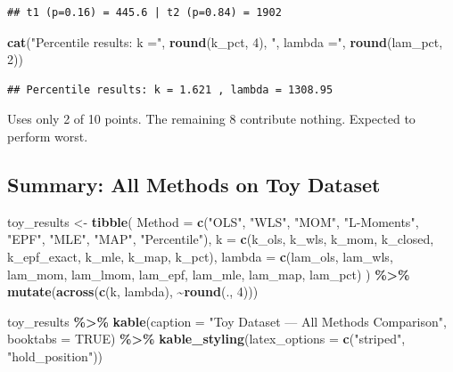 \documentclass[
]{article}
\newenvironment{Shaded}{\begin{snugshade}}{\end{snugshade}}
\newcommand{\AttributeTok}[1]{\textcolor[rgb]{0.13,0.29,0.53}{#1}}
\newcommand{\ConstantTok}[1]{\textcolor[rgb]{0.56,0.35,0.01}{#1}}
\newcommand{\DecValTok}[1]{\textcolor[rgb]{0.00,0.00,0.81}{#1}}
\newcommand{\FunctionTok}[1]{\textcolor[rgb]{0.13,0.29,0.53}{\textbf{#1}}}
\newcommand{\NormalTok}[1]{#1}
\newcommand{\OtherTok}[1]{\textcolor[rgb]{0.56,0.35,0.01}{#1}}
\newcommand{\SpecialCharTok}[1]{\textcolor[rgb]{0.81,0.36,0.00}{\textbf{#1}}}
\newcommand{\StringTok}[1]{\textcolor[rgb]{0.31,0.60,0.02}{#1}}
\begin{document}
\begin{verbatim}
## t1 (p=0.16) = 445.6 | t2 (p=0.84) = 1902
\end{verbatim}

\begin{Shaded}
\begin{Highlighting}[]
\FunctionTok{cat}\NormalTok{(}\StringTok{"Percentile results: k ="}\NormalTok{, }\FunctionTok{round}\NormalTok{(k\_pct, }\DecValTok{4}\NormalTok{), }\StringTok{", lambda ="}\NormalTok{, }\FunctionTok{round}\NormalTok{(lam\_pct, }\DecValTok{2}\NormalTok{))}
\end{Highlighting}
\end{Shaded}

\begin{verbatim}
## Percentile results: k = 1.621 , lambda = 1308.95
\end{verbatim}

Uses only 2 of 10 points. The remaining 8 contribute nothing. Expected
to perform worst.

\subsection{Summary: All Methods on Toy
Dataset}\label{summary-all-methods-on-toy-dataset}

\begin{Shaded}
\begin{Highlighting}[]
\NormalTok{toy\_results }\OtherTok{\textless{}{-}} \FunctionTok{tibble}\NormalTok{(}
  \AttributeTok{Method =} \FunctionTok{c}\NormalTok{(}\StringTok{"OLS"}\NormalTok{, }\StringTok{"WLS"}\NormalTok{, }\StringTok{"MOM"}\NormalTok{, }\StringTok{"L{-}Moments"}\NormalTok{, }\StringTok{"EPF"}\NormalTok{, }\StringTok{"MLE"}\NormalTok{, }\StringTok{"MAP"}\NormalTok{, }\StringTok{"Percentile"}\NormalTok{),}
  \AttributeTok{k =} \FunctionTok{c}\NormalTok{(k\_ols, k\_wls, k\_mom, k\_closed, k\_epf\_exact, k\_mle, k\_map, k\_pct),}
  \AttributeTok{lambda =} \FunctionTok{c}\NormalTok{(lam\_ols, lam\_wls, lam\_mom, lam\_lmom, lam\_epf, lam\_mle, lam\_map, lam\_pct)}
\NormalTok{) }\SpecialCharTok{\%\textgreater{}\%}
  \FunctionTok{mutate}\NormalTok{(}\FunctionTok{across}\NormalTok{(}\FunctionTok{c}\NormalTok{(k, lambda), }\SpecialCharTok{\textasciitilde{}}\FunctionTok{round}\NormalTok{(., }\DecValTok{4}\NormalTok{)))}

\NormalTok{toy\_results }\SpecialCharTok{\%\textgreater{}\%}
  \FunctionTok{kable}\NormalTok{(}\AttributeTok{caption =} \StringTok{"Toy Dataset — All Methods Comparison"}\NormalTok{,}
        \AttributeTok{booktabs =} \ConstantTok{TRUE}\NormalTok{) }\SpecialCharTok{\%\textgreater{}\%}
  \FunctionTok{kable\_styling}\NormalTok{(}\AttributeTok{latex\_options =} \FunctionTok{c}\NormalTok{(}\StringTok{"striped"}\NormalTok{, }\StringTok{"hold\_position"}\NormalTok{))}
\end{Highlighting}
\end{Shaded}
\end{document}
